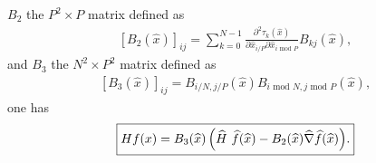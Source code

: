 \documentclass[a4paper,11pt,english]{sphinxmanual}
\begin{document}
\(B_2\) the \(P^2 \times P\) matrix defined as
\begin{equation*}
\begin{split}\left[B_2(\widehat{x})\right]_{ij} =
\sum_{k = 0}^{N-1}
\frac{\partial^2 \tau_k(\widehat{x})}{\partial \widehat{x}_{i / P} \partial \widehat{x}_{i\mbox{ mod }P}}
B_{kj}(\widehat{x}),\end{split}
\end{equation*}
and \(B_3\) the \(N^2 \times P^2\) matrix defined as
\begin{equation*}
\begin{split}\left[B_3(\widehat{x})\right]_{ij} =
B_{i / N, j / P}(\widehat{x}) B_{i\mbox{ mod }N, j\mbox{ mod }P}(\widehat{x}),\end{split}
\end{equation*}
one has
\begin{equation*}
\begin{split}\fbox{$H f(x) = B_3(\widehat{x})
\left(\widehat{H}\ \widehat{f}(\widehat{x}) - B_2(\widehat{x})\widehat{\nabla} \widehat{f}(\widehat{x})\right)$.}\end{split}
\end{equation*}
\end{document}
